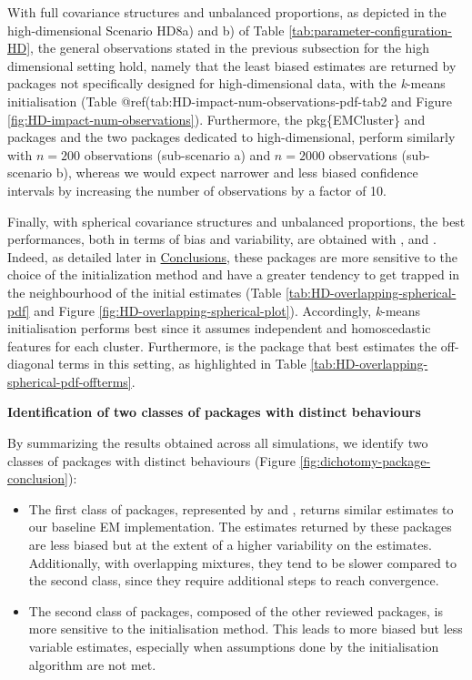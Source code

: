 \color{blue}

With full covariance structures and unbalanced proportions, as depicted in the high-dimensional Scenario HD8a) and b) of Table \ref{tab:parameter-configuration-HD}, the general observations stated in the previous subsection for the high dimensional setting hold, namely that the least biased estimates are returned by packages not specifically designed for high-dimensional data, with the \emph{k}-means initialisation (Table @ref(tab:HD-impact-num-observations-pdf-tab2 and Figure \ref{fig:HD-impact-num-observations}). Furthermore, the pkg\{EMCluster\} and  packages and the two packages dedicated to high-dimensional, perform similarly with \(n=200\) observations (sub-scenario a) and \(n=2000\) observations (sub-scenario b), whereas we would expect narrower and less biased confidence intervals by increasing the number of observations by a factor of 10.

Finally, with spherical covariance structures and unbalanced proportions, the best performances, both in terms of bias and variability, are obtained with ,  and . Indeed, as detailed later in \protect\hyperlink{conclusions}{Conclusions}, these packages are more sensitive to the choice of the initialization method and have a greater tendency to get trapped in the neighbourhood of the initial estimates (Table \ref{tab:HD-overlapping-spherical-pdf} and Figure \ref{fig:HD-overlapping-spherical-plot}). Accordingly, \emph{k}-means initialisation performs best since it assumes independent and homoscedastic features for each cluster.
Furthermore,  is the package that best estimates the off-diagonal terms in this setting, as highlighted in Table \ref{tab:HD-overlapping-spherical-pdf-offterms}.
\color{black}

\textbf{Identification of two classes of packages with distinct behaviours}

By summarizing the results obtained across all simulations, we identify two classes of packages with distinct behaviours (Figure
\ref{fig:dichotomy-package-conclusion}):

\begin{itemize}
\item
  The first class of packages, represented by  and , returns similar estimates to our baseline EM implementation. The estimates returned by these packages are less biased but at the extent of a higher variability on the estimates. Additionally, with overlapping mixtures, they tend to be slower compared to the second class, since they require additional steps to reach convergence.
\item
  The second class of packages, composed of the other
  reviewed packages, is more sensitive to the initialisation method. This leads to more
  biased but less variable estimates, especially when assumptions done by
  the initialisation algorithm are not met.
\end{itemize}

